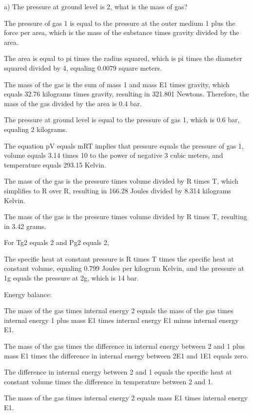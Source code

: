 a) The pressure at ground level is 2, what is the mass of gas?

The pressure of gas 1 is equal to the pressure at the outer medium 1 plus the force per area, which is the mass of the substance times gravity divided by the area.

The area is equal to pi times the radius squared, which is pi times the diameter squared divided by 4, equaling 0.0079 square meters.

The mass of the gas is the sum of mass 1 and mass E1 times gravity, which equals 32.76 kilograms times gravity, resulting in 321.801 Newtons. Therefore, the mass of the gas divided by the area is 0.4 bar.

The pressure at ground level is equal to the pressure of gas 1, which is 0.6 bar, equaling 2 kilograms.

The equation pV equals mRT implies that pressure equals the pressure of gas 1, volume equals 3.14 times 10 to the power of negative 3 cubic meters, and temperature equals 293.15 Kelvin.

The mass of the gas is the pressure times volume divided by R times T, which simplifies to R over R, resulting in 166.28 Joules divided by 8.314 kilograms Kelvin.

The mass of the gas is the pressure times volume divided by R times T, resulting in 3.42 grams.

For Tg2 equals 2 and Pg2 equals 2,

The specific heat at constant pressure is R times T times the specific heat at constant volume, equaling 0.799 Joules per kilogram Kelvin, and the pressure at 1g equals the pressure at 2g, which is 14 bar.

Energy balance:

The mass of the gas times internal energy 2 equals the mass of the gas times internal energy 1 plus mass E1 times internal energy E1 minus internal energy E1.

The mass of the gas times the difference in internal energy between 2 and 1 plus mass E1 times the difference in internal energy between 2E1 and 1E1 equals zero.

The difference in internal energy between 2 and 1 equals the specific heat at constant volume times the difference in temperature between 2 and 1.

The mass of the gas times internal energy 2 equals mass E1 times internal energy E1.